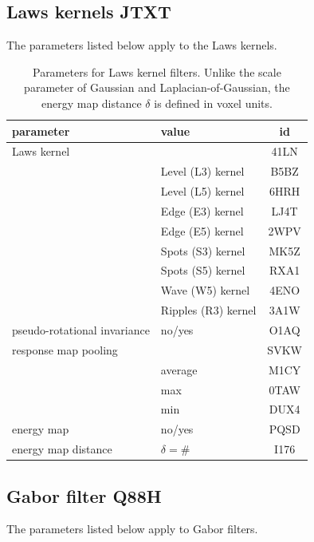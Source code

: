 \documentclass[fleqn,a4paper,oneside,openany]{book}
\newcommand\id[1]{{\hfill\normalsize{\idfont #1}}}
\newcommand\textid[1]{{\normalsize{\idfont #1}}}
\begin{document}
\FloatBarrier

\subsection[Laws kernels]{Laws kernels \id{JTXT}}
The parameters listed below apply to the Laws kernels.

\begin{table}[ht]
\centering
\small
\begin{tabular}{llc}
\toprule
\textbf{parameter} & \textbf{value} & \textbf{id}\\
\midrule
Laws kernel & & \textid{41LN}\\
& Level (L3) kernel & \textid{B5BZ}\\
& Level (L5) kernel & \textid{6HRH}\\
& Edge (E3) kernel & \textid{LJ4T}\\
& Edge (E5) kernel & \textid{2WPV}\\
& Spots (S3) kernel & \textid{MK5Z}\\
& Spots (S5) kernel & \textid{RXA1}\\
& Wave (W5) kernel & \textid{4ENO}\\
& Ripples (R3) kernel & \textid{3A1W}\\
pseudo-rotational invariance & no/yes & \textid{O1AQ}\\
response map pooling & & \textid{SVKW}\\
& average & \textid{M1CY}\\
& max & \textid{0TAW}\\
& min & \textid{DUX4}\\
energy map & no/yes & \textid{PQSD}\\
energy map distance & \(\delta=\#\) & \textid{I176}\\
\bottomrule
\end{tabular}
\caption{Parameters for Laws kernel filters. Unlike the scale parameter of Gaussian and Laplacian-of-Gaussian, the energy map distance \(\delta\) is defined in voxel units.}
\end{table}

\FloatBarrier

\subsection[Gabor filter]{Gabor filter \id{Q88H}}
The parameters listed below apply to Gabor filters.
\end{document}
